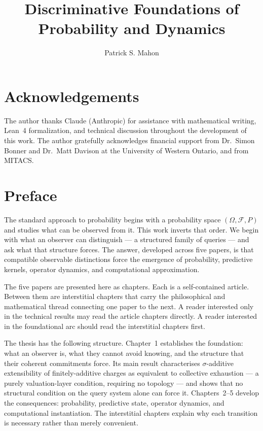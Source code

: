\documentclass[12pt, oneside]{book}
\title{Discriminative Foundations of Probability and Dynamics}
\author{Patrick S. Mahon}
\date{}
\theoremstyle{definition}
\theoremstyle{remark}
\begin{document}
\frontmatter

\maketitle

\tableofcontents

\chapter*{Acknowledgements}

The author thanks Claude (Anthropic) for assistance with mathematical writing,
Lean~4 formalization, and technical discussion throughout the development of this
work.  The author gratefully acknowledges financial support from Dr.\ Simon Bonner
and Dr.\ Matt Davison at the University of Western Ontario, and from MITACS.

\chapter*{Preface}

The standard approach to probability begins with a probability space
$(\Omega, \mathcal{F}, P)$ and studies what can be observed from it.
This work inverts that order.  We begin with what an observer can
distinguish --- a structured family of queries --- and ask what that
structure forces.  The answer, developed across five papers, is that
compatible observable distinctions force the emergence of probability,
predictive kernels, operator dynamics, and computational approximation.

The five papers are presented here as chapters.  Each is a
self-contained article.  Between them are interstitial chapters that
carry the philosophical and mathematical thread connecting one paper
to the next.  A reader interested only in the technical results may
read the article chapters directly.  A reader interested in the
foundational arc should read the interstitial chapters first.

The thesis has the following structure.  Chapter~1 establishes the
foundation: what an observer is, what they cannot avoid knowing, and
the structure that their coherent commitments force.  Its main result
characterises $\sigma$-additive extensibility of finitely-additive
charges as equivalent to collective exhaustion --- a purely
valuation-layer condition, requiring no topology --- and shows that no
structural condition on the query system alone can force it.
Chapters~2--5 develop the consequences: probability, predictive state,
operator dynamics, and computational instantiation.
The interstitial chapters explain why each transition is necessary
rather than merely convenient.
\end{document}
